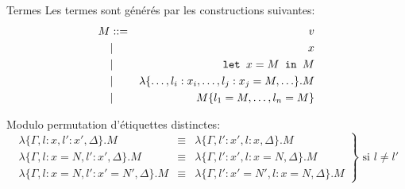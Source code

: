 \documentclass{beamer}
\newcommand{\letin}[3]{\text{\texttt{let }} #1 = #2 \text{\texttt{ in }} #3}
\begin{document}
\begin{ssl}{Termes}
Les termes sont générés par les constructions suivantes:
\begin{eqnarray*}
  M &::=& v \\
  &|& x \\
  &|& \letin{x}{M}{M} \\
  &|& \lambda \{\ldots, l_i:x_i, \ldots, l_j:x_j=M, \ldots\}.M \\
  &|& M\{l_1=M,\ldots,l_n=M\}
\end{eqnarray*}


Modulo permutation d'étiquettes distinctes:
\begin{equation*}
  \label{eq:permutation}
 \left.\begin{array}{rcl}
 \lambda \{ \Gamma, l:x, l':x', \Delta \}.M & \equiv &
 \lambda \{ \Gamma, l':x', l:x, \Delta \}.M \\
 \lambda \{ \Gamma, l:x=N, l':x', \Delta \}.M & \equiv &
 \lambda \{ \Gamma, l':x', l:x=N, \Delta \}.M \\
 \lambda \{ \Gamma, l:x=N, l':x'=N', \Delta \}.M & \equiv &
 \lambda \{ \Gamma, l':x'=N', l:x=N, \Delta \}.M
 \end{array}\right\}
 \mbox{ si $l\neq l'$}
\end{equation*}
\end{ssl}
\end{document}

